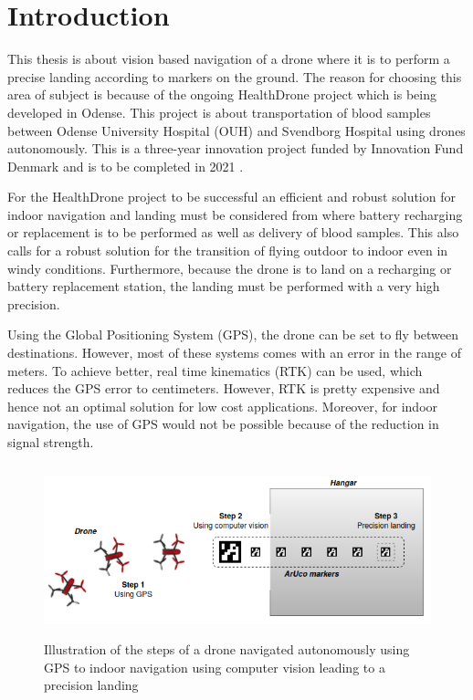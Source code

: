 \documentclass[../Head/Report.tex]{subfiles}
\begin{document}
\section{Introduction}

This thesis is about vision based navigation of a drone where it is to perform a precise landing according to markers on the ground. The reason for choosing this area of subject is because of the ongoing HealthDrone project which is being developed in Odense. This project is about transportation of blood samples between Odense University Hospital (OUH) and Svendborg Hospital using drones autonomously. This is a three-year innovation project funded by Innovation Fund Denmark and is to be completed in 2021 \cite{HealthDrone}.

For the HealthDrone project to be successful an efficient and robust solution for indoor navigation and landing must be considered from where battery recharging or replacement is to be performed as well as delivery of blood samples. This also calls for a robust solution for the transition of flying outdoor to indoor even in windy conditions. Furthermore, because the drone is to land on a recharging or battery replacement station, the landing must be performed with a very high precision.

Using the Global Positioning System (GPS), the drone can be set to fly between destinations. However, most of these systems comes with an error in the range of meters. To achieve better, real time kinematics (RTK) can be used, which reduces the GPS error to centimeters. However, RTK is pretty expensive and hence not an optimal solution for low cost applications. Moreover, for indoor navigation, the use of GPS would not be possible because of the reduction in signal strength. 

\begin{figure}[H]
	\centering
	\includegraphics[height=5cm]{../Figures/master_thesis_illu.png}
	\captionsetup{justification=centering}
    \caption{Illustration of the steps of a drone navigated autonomously using GPS to indoor navigation using computer vision leading to a precision landing }
    \label{fig:masterProjectIllustration}
\end{figure}
\end{document}
